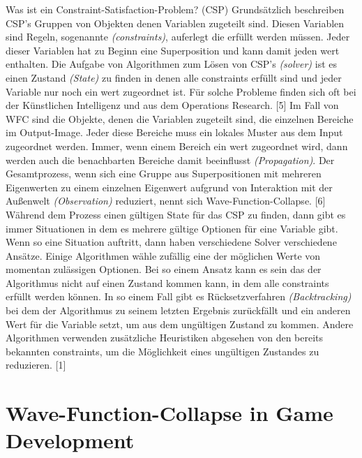 \documentclass[12pt]{report}
\begin{document}
Was ist ein Constraint-Satisfaction-Problem? {(CSP)}
Grundsätzlich beschreiben CSP's Gruppen von Objekten denen Variablen zugeteilt sind.
Diesen Variablen sind Regeln, sogenannte \textit{(constraints)}, auferlegt die erfüllt werden müssen.
Jeder dieser Variablen hat zu Beginn eine Superposition und kann damit jeden wert enthalten.
Die Aufgabe von Algorithmen zum Lösen von CSP's \textit{(solver)} ist es einen Zustand \textit{(State)} zu finden in denen alle constraints erfüllt sind und jeder Variable nur noch ein wert zugeordnet ist.
Für solche Probleme finden sich oft bei der Künstlichen Intelligenz und aus dem Operations Research. {[5]}
Im Fall von WFC sind die Objekte, denen die Variablen zugeteilt sind, die einzelnen Bereiche im Output-Image.
Jeder diese Bereiche muss ein lokales Muster aus dem Input zugeordnet werden.
Immer, wenn einem Bereich ein wert zugeordnet wird, dann werden auch die benachbarten Bereiche damit beeinflusst \textit{(Propagation)}.
Der Gesamtprozess, wenn sich eine Gruppe aus Superpositionen mit mehreren Eigenwerten zu einem einzelnen Eigenwert aufgrund von Interaktion mit der Außenwelt \textit{(Observation)} reduziert,
nennt sich Wave-Function-Collapse. {[6]}
Während dem Prozess einen gültigen State für das CSP zu finden, dann gibt es immer Situationen in dem es mehrere gültige Optionen für eine Variable gibt.
Wenn so eine Situation auftritt, dann haben verschiedene Solver verschiedene Ansätze.
Einige Algorithmen wähle zufällig eine der möglichen Werte von momentan zulässigen Optionen.
Bei so einem Ansatz kann es sein das der Algorithmus nicht auf einen Zustand kommen kann, in dem alle constraints erfüllt werden können.
In so einem Fall gibt es Rücksetzverfahren \textit{(Backtracking)} bei dem der Algorithmus zu seinem letzten Ergebnis zurückfällt und ein anderen Wert für die Variable setzt, um aus dem
ungültigen Zustand zu kommen.
Andere Algorithmen verwenden zusätzliche Heuristiken abgesehen von den bereits bekannten constraints, um die Möglichkeit eines ungültigen Zustandes zu reduzieren. {[1]} 

\section{Wave-Function-Collapse in Game Development}
\end{document}
